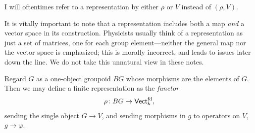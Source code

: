 \documentclass[11pt]{article}
\begin{document}
\begin{nnote}
    I will oftentimes refer to a representation by either $\rho$
    or $V$ instead of $(\rho, V)$.
\end{nnote}

\begin{reemark}
    It is vitally important to note that a representation
    includes both a map \emph{and} a vector space in its construction.
    Physicists usually think of a representation as just a set of matrices,
    one for each group element---neither the general map nor the vector space 
    is emphasized; this is morally incorrect, and leads to issues later down the 
    line. We do not take this unnatural view in these notes.
\end{reemark}

\begin{nnote}
    Regard $G$ as a one-object groupoid $BG$ whose morphisms
    are the elements of $G$. Then we may define a finite representation 
    as the \emph{functor}
    \begin{align*}
        \rho \colon BG \to \text{\sffamily{Vect}}_k^{\rm fd},
    \end{align*}
    sending the single object $G \to V$, and sending morphisms
    in $g$ to operators on $V$, $g \to \varphi$.
\end{nnote}
\end{document}
